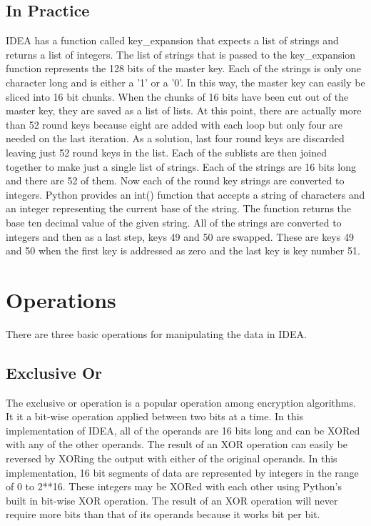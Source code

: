 \documentclass[12pt]{article}
\begin{document}
\subsection{In Practice}
IDEA has a function called key\_expansion that expects a list of strings and returns a list of integers. The list of strings that is passed to the key\_expansion function represents the 128 bits of the master key. Each of the strings is only one character long and is either a '1' or a '0'. In this way, the master key can easily be sliced into 16 bit chunks. 
When the chunks of 16 bits have been cut out of the master key, they are saved as a list of lists. At this point, there are actually more than 52 round keys because eight are added with each loop but only four are needed on the last iteration. As a solution, last four round keys are discarded leaving just 52 round keys in the list. Each of the sublists are then joined together to make just a single list of strings. Each of the strings are 16 bits long and there are 52 of them.
Now each of the round key strings are converted to integers. Python provides an int() function that accepts a string of characters and an integer representing the current base of the string. The function returns the base ten decimal value of the given string.
All of the strings are converted to integers and then as a last step, keys 49 and 50 are swapped. These are keys 49 and 50 when the first key is addressed as zero and the last key is key number 51.
\section{Operations}
There are three basic operations for manipulating the data in IDEA.
\subsection{Exclusive Or}
The exclusive or operation is a popular operation among encryption algorithms. It it a bit-wise operation applied between two bits at a time. In this implementation of IDEA, all of the operands are 16 bits long and can be XORed with any of the other operands. The result of an XOR operation can easily be reversed by XORing the output with either of the original operands.
In this implementation, 16 bit segments of data are represented by integers in the range of 0 to 2**16. These integers may be XORed with each other using Python's built in bit-wise XOR operation. The result of an XOR operation will never require more bits than that of its operands because it works bit per bit.
\end{document}
